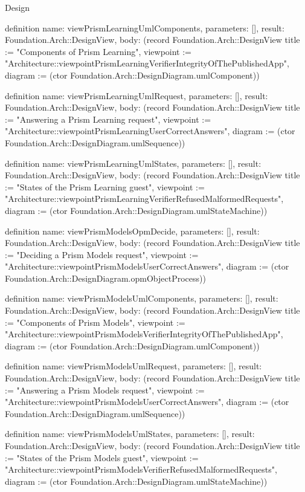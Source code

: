 \begin{lexlean}{Design}
\begin{semanticmodule}
definition{
  name: viewPrismLearningUmlComponents,
  parameters: [],
  result: Foundation.Arch::DesignView,
  body: (record Foundation.Arch::DesignView {title := "Components of Prism Learning", viewpoint := "Architecture::viewpointPrismLearningVerifierIntegrityOfThePublishedApp", diagram := (ctor Foundation.Arch::DesignDiagram.umlComponent)})
}

definition{
  name: viewPrismLearningUmlRequest,
  parameters: [],
  result: Foundation.Arch::DesignView,
  body: (record Foundation.Arch::DesignView {title := "Answering a Prism Learning request", viewpoint := "Architecture::viewpointPrismLearningUserCorrectAnswers", diagram := (ctor Foundation.Arch::DesignDiagram.umlSequence)})
}

definition{
  name: viewPrismLearningUmlStates,
  parameters: [],
  result: Foundation.Arch::DesignView,
  body: (record Foundation.Arch::DesignView {title := "States of the Prism Learning guest", viewpoint := "Architecture::viewpointPrismLearningVerifierRefusedMalformedRequests", diagram := (ctor Foundation.Arch::DesignDiagram.umlStateMachine)})
}

definition{
  name: viewPrismModelsOpmDecide,
  parameters: [],
  result: Foundation.Arch::DesignView,
  body: (record Foundation.Arch::DesignView {title := "Deciding a Prism Models request", viewpoint := "Architecture::viewpointPrismModelsUserCorrectAnswers", diagram := (ctor Foundation.Arch::DesignDiagram.opmObjectProcess)})
}

definition{
  name: viewPrismModelsUmlComponents,
  parameters: [],
  result: Foundation.Arch::DesignView,
  body: (record Foundation.Arch::DesignView {title := "Components of Prism Models", viewpoint := "Architecture::viewpointPrismModelsVerifierIntegrityOfThePublishedApp", diagram := (ctor Foundation.Arch::DesignDiagram.umlComponent)})
}

definition{
  name: viewPrismModelsUmlRequest,
  parameters: [],
  result: Foundation.Arch::DesignView,
  body: (record Foundation.Arch::DesignView {title := "Answering a Prism Models request", viewpoint := "Architecture::viewpointPrismModelsUserCorrectAnswers", diagram := (ctor Foundation.Arch::DesignDiagram.umlSequence)})
}

definition{
  name: viewPrismModelsUmlStates,
  parameters: [],
  result: Foundation.Arch::DesignView,
  body: (record Foundation.Arch::DesignView {title := "States of the Prism Models guest", viewpoint := "Architecture::viewpointPrismModelsVerifierRefusedMalformedRequests", diagram := (ctor Foundation.Arch::DesignDiagram.umlStateMachine)})
}


\end{semanticmodule}
\end{lexlean}
